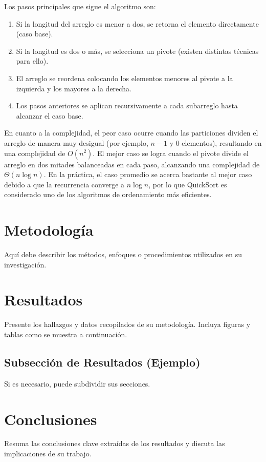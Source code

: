 \documentclass[conference]{IEEEtran}
\begin{document}
Los pasos principales que sigue el algoritmo son:
\begin{enumerate}
    \item Si la longitud del arreglo es menor a dos, se retorna el elemento directamente (caso base).
    \item Si la longitud es dos o más, se selecciona un pivote (existen distintas técnicas para ello).
    \item El arreglo se reordena colocando los elementos menores al pivote a la izquierda y los mayores a la derecha.
    \item Los pasos anteriores se aplican recursivamente a cada subarreglo hasta alcanzar el caso base.
\end{enumerate}

En cuanto a la complejidad, el peor caso ocurre cuando las particiones dividen el arreglo de manera muy desigual (por ejemplo, $n-1$ y $0$ elementos), resultando en una complejidad de $O(n^2)$. El mejor caso se logra cuando el pivote divide el arreglo en dos mitades balanceadas en cada paso, alcanzando una complejidad de $\Theta(n \log n)$. En la práctica, el caso promedio se acerca bastante al mejor caso debido a que la recurrencia converge a $n \log n$, por lo que QuickSort es considerado uno de los algoritmos de ordenamiento más eficientes.

\section{Metodología}
Aquí debe describir los métodos, enfoques o procedimientos utilizados en su investigación.

\section{Resultados}
Presente los hallazgos y datos recopilados de su metodología. Incluya figuras y tablas como se muestra a continuación.

\subsection{Subsección de Resultados (Ejemplo)}
Si es necesario, puede subdividir sus secciones.

\section{Conclusiones}
Resuma las conclusiones clave extraídas de los resultados y discuta las implicaciones de su trabajo.
\end{document}
